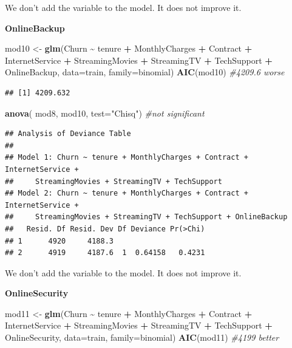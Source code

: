 \documentclass[
  twoside]{article}
\newenvironment{Shaded}{\begin{snugshade}}{\end{snugshade}}
\newcommand{\AttributeTok}[1]{\textcolor[rgb]{0.13,0.29,0.53}{#1}}
\newcommand{\CommentTok}[1]{\textcolor[rgb]{0.56,0.35,0.01}{\textit{#1}}}
\newcommand{\FunctionTok}[1]{\textcolor[rgb]{0.13,0.29,0.53}{\textbf{#1}}}
\newcommand{\NormalTok}[1]{#1}
\newcommand{\OtherTok}[1]{\textcolor[rgb]{0.56,0.35,0.01}{#1}}
\newcommand{\SpecialCharTok}[1]{\textcolor[rgb]{0.81,0.36,0.00}{\textbf{#1}}}
\newcommand{\StringTok}[1]{\textcolor[rgb]{0.31,0.60,0.02}{#1}}
\begin{document}
We don't add the variable to the model. It does not improve it.

\textbf{OnlineBackup}

\begin{Shaded}
\begin{Highlighting}[]
\NormalTok{mod10 }\OtherTok{\textless{}{-}} \FunctionTok{glm}\NormalTok{(Churn }\SpecialCharTok{\textasciitilde{}}\NormalTok{ tenure }\SpecialCharTok{+}\NormalTok{ MonthlyCharges }\SpecialCharTok{+}\NormalTok{ Contract }\SpecialCharTok{+}\NormalTok{ InternetService }\SpecialCharTok{+} 
\NormalTok{               StreamingMovies }\SpecialCharTok{+}\NormalTok{ StreamingTV }\SpecialCharTok{+}\NormalTok{ TechSupport }\SpecialCharTok{+}\NormalTok{ OnlineBackup, }
             \AttributeTok{data=}\NormalTok{train, }\AttributeTok{family=}\NormalTok{binomial)}
\FunctionTok{AIC}\NormalTok{(mod10) }\CommentTok{\#4209.6 worse}
\end{Highlighting}
\end{Shaded}

\begin{verbatim}
## [1] 4209.632
\end{verbatim}

\begin{Shaded}
\begin{Highlighting}[]
\FunctionTok{anova}\NormalTok{( mod8, mod10,  }\AttributeTok{test=}\StringTok{"Chisq"}\NormalTok{) }\CommentTok{\#not significant}
\end{Highlighting}
\end{Shaded}

\begin{verbatim}
## Analysis of Deviance Table
## 
## Model 1: Churn ~ tenure + MonthlyCharges + Contract + InternetService + 
##     StreamingMovies + StreamingTV + TechSupport
## Model 2: Churn ~ tenure + MonthlyCharges + Contract + InternetService + 
##     StreamingMovies + StreamingTV + TechSupport + OnlineBackup
##   Resid. Df Resid. Dev Df Deviance Pr(>Chi)
## 1      4920     4188.3                     
## 2      4919     4187.6  1  0.64158   0.4231
\end{verbatim}

We don't add the variable to the model. It does not improve it.

\textbf{OnlineSecurity}

\begin{Shaded}
\begin{Highlighting}[]
\NormalTok{mod11 }\OtherTok{\textless{}{-}} \FunctionTok{glm}\NormalTok{(Churn }\SpecialCharTok{\textasciitilde{}}\NormalTok{ tenure }\SpecialCharTok{+}\NormalTok{ MonthlyCharges }\SpecialCharTok{+}\NormalTok{ Contract }\SpecialCharTok{+}\NormalTok{ InternetService }\SpecialCharTok{+} 
\NormalTok{               StreamingMovies }\SpecialCharTok{+}\NormalTok{ StreamingTV }\SpecialCharTok{+}\NormalTok{ TechSupport }\SpecialCharTok{+}\NormalTok{ OnlineSecurity, }
             \AttributeTok{data=}\NormalTok{train, }\AttributeTok{family=}\NormalTok{binomial)}
\FunctionTok{AIC}\NormalTok{(mod11) }\CommentTok{\#4199 better}
\end{Highlighting}
\end{Shaded}
\end{document}
